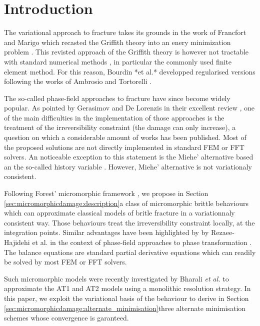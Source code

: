 \section{Introduction}

The variational approach to fracture takes its grounds in the work of
Francfort and Marigo which recasted the Griffith theory into an enery
minimization problem \cite{francfort_revisiting_1998,francfort_vers_2002}.
This revisted approach of the Griffith theory is however not tractable
with standard numerical methods
\cite{bourdin_numerical_2000,chambolle_approximation_2018}, in particular
the commonly used finite element method. For this reason, Bourdin *et
al.* developped regularised versions \cite{bourdin_numerical_2000} following
the works of Ambrosio and Tortorelli \cite{ambrosio_approximation_1990}.

The so-called phase-field approaches to fracture have since become
widely popular. As pointed by Gerasimov and De Lorenzis in their
excellent review \cite{gerasimov_numerical_2020}, one of the main
difficulties in the implementation of those approaches is the treatment
of the irreversibility constraint (the damage can only increase), a
question on which a considerable amount of works has been published.
Most of the proposed solutions are not directly implemented in standard
FEM or FFT solvers. An noticeable exception to this statement is the
Miehe' alternative based an the so-called history variable
\cite{miehe_phase_2010}. However, Miehe' alternative is not variationaly
consistent.

Following Forest' micromorphic framework
\cite{forest_micromorphic_2009,forest_nonlinear_2016}, we propose in
Section \ref{sec:micromorphicdamage:description}a class of micromorphic
brittle behaviours which can approximate classical models of britle
fracture in a variationnaly consistent way. Those behaviours treat the
irreversibility constraint locally, at the integration points. Similar
advantages have been highlighted by by Rezaee-Hajidehi et al. in the
context of phase-field approaches to phase transformation
\cite{rezaee-hajidehi_micromorphic_2021}. The balance equations are
standard partial derivative equations which can readily be solved by
most FEM or FFT solvers.

Such micromorphic models were recently investigated by Bharali \textit{et al.}
\cite{bharali_computational_2021} to approximate the AT1 and AT2 models
using a monolithic resolution strategy. In this paper, we exploit the
variational basis of the behaviour to derive in Section
\ref{sec:micromorphicdamage:alternate_minimisation}three alternate
minimisation schemes whose convergence is garanteed.

